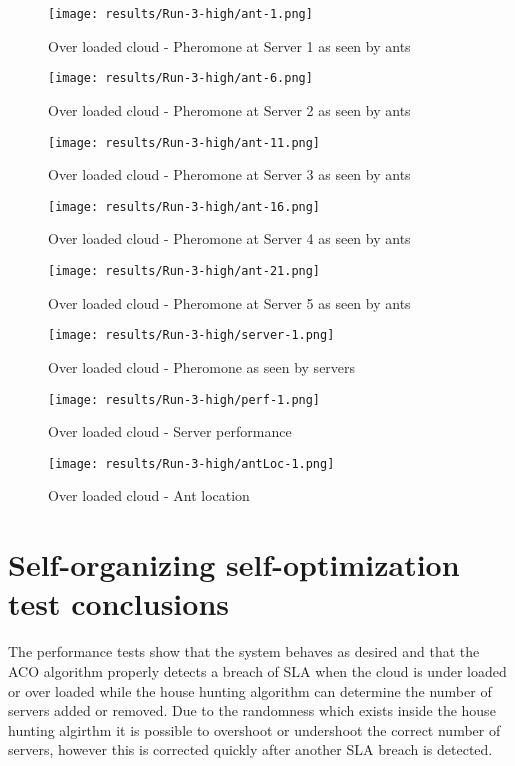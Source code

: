 \begin{figure}[!ht]
	\centering
		\texttt{[image: results/Run-3-high/ant-1.png]}
	\caption{Over loaded cloud - Pheromone at Server 1 as seen by ants}
	\label{fig:3serv-ant1-high}
\end{figure}

\begin{figure}
	\centering
		\texttt{[image: results/Run-3-high/ant-6.png]}
	\caption{Over loaded cloud - Pheromone at Server 2 as seen by ants}
	\label{fig:3serv-ant6-high}
\end{figure}

\begin{figure}
	\centering
		\texttt{[image: results/Run-3-high/ant-11.png]}
	\caption{Over loaded cloud - Pheromone at Server 3 as seen by ants}
	\label{fig:3serv-ant11-high}
\end{figure}

\begin{figure}
	\centering
		\texttt{[image: results/Run-3-high/ant-16.png]}
	\caption{Over loaded cloud - Pheromone at Server 4 as seen by ants}
	\label{fig:3serv-ant16-high}
\end{figure}

\begin{figure}
	\centering
		\texttt{[image: results/Run-3-high/ant-21.png]}
	\caption{Over loaded cloud - Pheromone at Server 5 as seen by ants}
	\label{fig:3serv-ant21-high}
\end{figure}

\begin{figure}
	\centering
		\texttt{[image: results/Run-3-high/server-1.png]}
	\caption{Over loaded cloud - Pheromone as seen by servers}
	\label{fig:3serv-pher-high}
\end{figure}

\begin{figure}
	\centering
		\texttt{[image: results/Run-3-high/perf-1.png]}
	\caption{Over loaded cloud - Server performance}
	\label{fig:3serv-perf-high}
\end{figure}

\begin{figure}
	\centering
		\texttt{[image: results/Run-3-high/antLoc-1.png]}
	\caption{Over loaded cloud - Ant location}
	\label{fig:3serv-antloc-high}
\end{figure}

\section{Self-organizing self-optimization test conclusions}

The performance tests show that the system behaves as desired and that the ACO algorithm properly detects a breach of SLA when the cloud is under loaded or over loaded while the house hunting algorithm can determine the number of servers added or removed. Due to the randomness which exists inside the house hunting algirthm it is possible to overshoot or undershoot the correct number of servers, however this is corrected quickly after another SLA breach is detected.